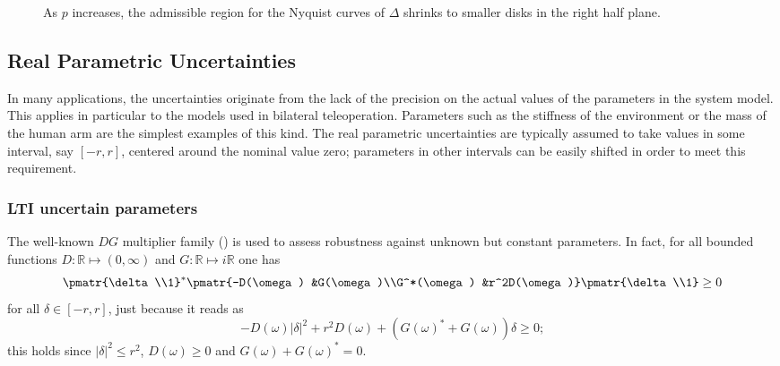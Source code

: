 \begin{figure}%
\centering
{}
\caption{As $p$ increases, the admissible region for the Nyquist curves of $\Delta$ shrinks to smaller disks in the right half plane.}
\label{fig:pregions}%
\end{figure}


\subsection{Real Parametric Uncertainties}\label{sec:ltvenv}
In many applications, the uncertainties originate from the lack of the precision on the actual values of the parameters in the system model. This applies in particular to the models used in bilateral teleoperation. Parameters such as the stiffness of the environment or the mass of the human arm are the simplest examples of this kind. The real parametric uncertainties are typically assumed to take values in some interval, say $\left[ -r,r \right]$, centered around the nominal value zero; parameters in other intervals can be easily shifted in order to meet this requirement.

\subsubsection{LTI uncertain parameters} The well-known $DG$ multiplier family (\cite{meinsmafu,fantits}) is used to assess robustness against unknown but constant parameters. In fact, for all bounded functions $D:\mathbb{R}\mapsto(0,\infty)$ and $G:\mathbb{R}\mapsto i\mathbb{R}$ one has
\begin{equation*}
\pmatr{\delta\\1}^*\pmatr{-D(\omega) &G(\omega)\\G^*(\omega) &r^2D(\omega)}\pmatr{\delta\\1}\geq 0
\end{equation*}
for all $\delta\in[-r,r]$, just because it reads as
\[
-D(\omega)|\delta|^2 + r^2 D(\omega) + (G(\omega)^*+G(\omega))\delta\geq 0;
\]
this holds since $|\delta|^2\leq r^2$, $D(\omega)\geq 0$ and $G(\omega)+G(\omega)^*=0$.



